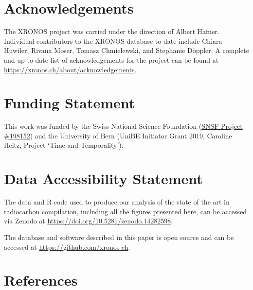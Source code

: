 \documentclass[
  number,
  doubleblind]{elsarticle}
\begin{document}
\section{Acknowledgements}\label{acknowledgements}

The XRONOS project was carried under the direction of Albert Hafner.
Individual contributors to the XRONOS database to date include Chiara
Huwiler, Rivana Moser, Tomasz Chmielewski, and Stephanie Döppler. A
complete and up-to-date list of acknowledgements for the project can be
found at \url{https://xronos.ch/about/acknowledgements}.

\section{Funding Statement}\label{funding-statement}

This work was funded by the Swiss National Science Foundation
(\href{https://data.snf.ch/grants/grant/198153}{SNSF Project \#198152})
and the University of Bern (UniBE Initiator Grant 2019, Caroline Heitz,
Project `Time and Temporality').

\section{Data Accessibility
Statement}\label{data-accessibility-statement}

The data and R code used to produce our analysis of the state of the art
in radiocarbon compilation, including all the figures presented here,
can be accessed via Zenodo at
\url{https://doi.org/10.5281/zenodo.14282598}.

The database and software described in this paper is open source and can
be accessed at \url{https://github.com/xronos-ch}.

\section*{References}\label{references}
\end{document}
